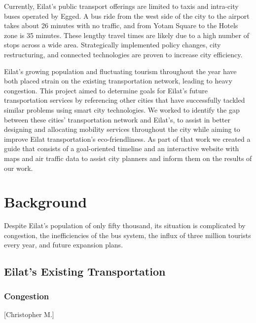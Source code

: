 \documentclass[12pt]{article}                               %
\begin{document}
Currently, Eilat's public transport offerings are limited to taxis and intra-city buses operated by Egged. A bus ride from the west side of the city to the airport takes about 26 minutes with no traffic, and from Yotam Square to the Hotels zone is 35 minutes. These lengthy travel times are likely due to a high number of stops across a wide area. Strategically implemented policy changes, city restructuring, and connected technologies are proven to increase city efficiency.

Eilat's growing population and fluctuating tourism throughout the year have both placed strain on the existing transportation network, leading to heavy congestion. This project aimed to determine goals for Eilat's future transportation services by referencing other cities that have successfully tackled similar problems using smart city technologies. We worked to identify the gap between these cities' transportation network and Eilat's, to assist in better designing and allocating mobility services throughout the city while aiming to improve Eilat transportation's eco-friendliness. As part of that work we created a guide that consists of a goal-oriented timeline and an interactive website with maps and air traffic data to assist city planners and inform them on the results of our work.
 
\newpage
\section{Background}
Despite Eilat's population of only fifty thousand, its situation is complicated by congestion, the inefficiencies of the bus system, the influx of three million tourists every year, and future expansion plans.

\subsection{Eilat's Existing Transportation}
\subsubsection{Congestion}[Christopher M.]
\end{document}
